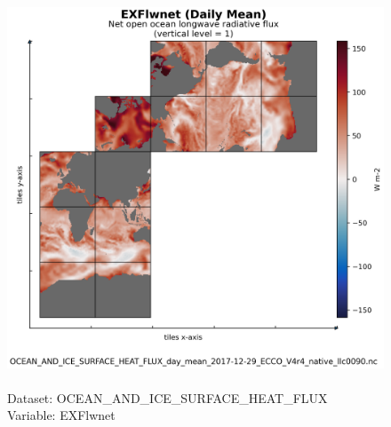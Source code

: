 \begin{figure}[H]
\centering
\includegraphics[scale=0.5]{../images/plots/native_plots/Ocean_and_Sea-Ice_Surface_Heat_Fluxes/EXFlwnet.png}
\caption{\\Dataset: OCEAN\_AND\_ICE\_SURFACE\_HEAT\_FLUX\\Variable: EXFlwnet}
\label{tab:table-OCEAN_AND_ICE_SURFACE_HEAT_FLUX_EXFlwnet-Plot}
\end{figure}
\pagebreak
